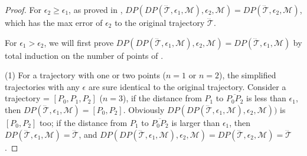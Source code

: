 \begin{proof}
	For $\epsilon_2 \ge \epsilon_1$, as proved in \cite{Cao:Spatio}, $DP(DP(\dddot{\mathcal{T}}, \epsilon_1, \mathcal{M}), \epsilon_2, \mathcal{M}) = DP(\dddot{\mathcal{T}}, \epsilon_2, \mathcal{M})$, which has the max error of $\epsilon_2$ to the original trajectory $\dddot{\mathcal{T}}$.
	
	For $\epsilon_1 > \epsilon_2$, we will first prove $DP(DP(\dddot{\mathcal{T}}, \epsilon_1, \mathcal{M}), \epsilon_2, \mathcal{M}) = DP(\dddot{\mathcal{T}}, \epsilon_1, \mathcal{M})$ by total induction on the number of points of .
	
	(1)  For a trajectory  with one or two points ($n=1$ or $n=2$), the simplified trajectories with any $\epsilon$ are sure identical to the original trajectory.
	Consider a trajectory  =	$[P_0, P_1, P_2]$ ($n = 3$),
	if the distance from $P_1$ to $\overline{P_0P_2}$ is less than $\epsilon_1$, then $DP(\dddot{\mathcal{T}}, \epsilon_1, \mathcal{M}) = [P_0, P_2]$. Obviously $DP(DP(\dddot{\mathcal{T}}, \epsilon_1, \mathcal{M}), \epsilon_2, \mathcal{M}))$ is $[P_0, P_2]$ too;	
	if the distance from $P_1$ to $\overline{P_0P_2}$ is larger than $\epsilon_1$, then $DP(\dddot{\mathcal{T}}, \epsilon_1, \mathcal{M})=\dddot{\mathcal{T}}$, and $DP(DP(\dddot{\mathcal{T}}, \epsilon_1, \mathcal{M}), \epsilon_2, \mathcal{M}) = DP(\dddot{\mathcal{T}}, \epsilon_2, \mathcal{M})=\dddot{\mathcal{T}}$.
	

\end{proof}
